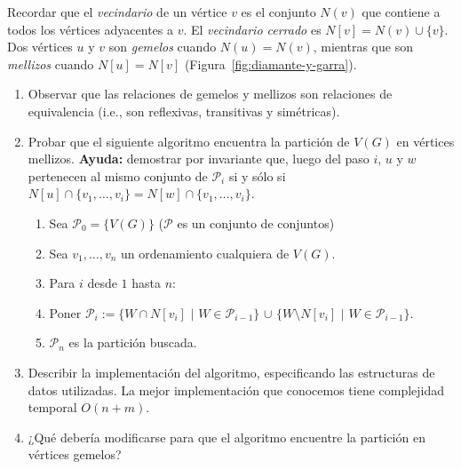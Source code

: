 

 \item Recordar que el \emph{vecindario} de un vértice $v$ es el conjunto $N(v)$ que contiene a todos los vértices adyacentes a $v$.  El \emph{vecindario cerrado} es $N[v] = N(v) \cup \{v\}$.  Dos vértices $u$ y $v$ son \emph{gemelos} cuando $N(u) = N(v)$, mientras que son \emph{mellizos} cuando $N[u] = N[v]$ (Figura~\ref{fig:diamante-y-garra}).
 \begin{enumerate}[label=$\alph*)$,ref=$\alph*)$]
  \item Observar que las relaciones de gemelos y mellizos son relaciones de equivalencia (i.e., son reflexivas, transitivas y simétricas).
  \item Probar que el siguiente algoritmo encuentra la partición de $V(G)$ en vértices mellizos.  \textbf{Ayuda:} demostrar por invariante que, luego del paso $i$, $u$ y $w$ pertenecen al mismo conjunto de $\mathcal{P}_i$ si y sólo si $N[u] \cap \{v_1, \ldots, v_i\} = N[w] \cap \{v_1, \ldots, v_i\}$.
  \begin{enumerate}[label=$\arabic*$.]
    \item Sea $\mathcal{P}_0 = \{V(G)\}$ ($\mathcal{P}$ es un conjunto de conjuntos)
    \item Sea $v_1, \ldots, v_n$ un ordenamiento cualquiera de $V(G)$.
    \item Para $i$ desde $1$ hasta $n$:
    \item \hspace{7mm} Poner $\mathcal{P}_i := \{W \cap N[v_i]$ $\mid$ $W \in \mathcal{P}_{i-1}\}$ $\cup$ $\{W \setminus N[v_i]$ $\mid$ $W \in \mathcal{P}_{i-1}\}$.
    \item $\mathcal{P}_n$ es la partición buscada.
  \end{enumerate}
  \item Describir la implementación del algoritmo, especificando las estructuras de datos utilizadas.  La mejor implementación que conocemos tiene complejidad temporal $O(n+m)$.
  \item ¿Qué debería modificarse para que el algoritmo encuentre la partición en vértices gemelos?
 \end{enumerate}



